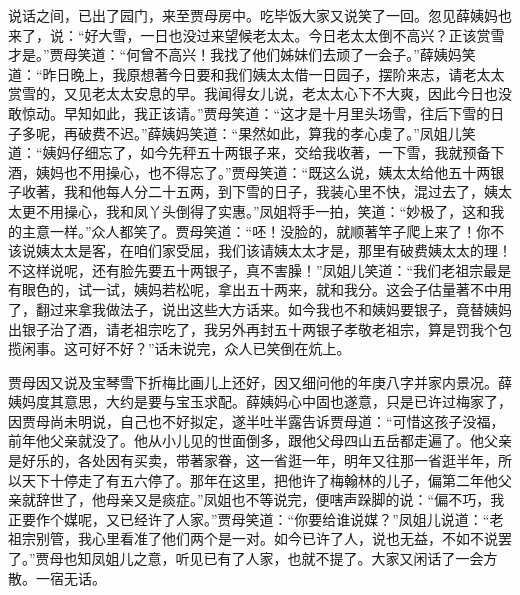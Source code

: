 \begin{parag}
    说话之间，已出了园门，来至贾母房中。吃毕饭大家又说笑了一回。忽见薛姨妈也来了，说：“好大雪，一日也没过来望候老太太。今日老太太倒不高兴？正该赏雪才是。”贾母笑道：“何曾不高兴！我找了他们姊妹们去顽了一会子。”薛姨妈笑道：“昨日晚上，我原想著今日要和我们姨太太借一日园子，摆阶来志，请老太太赏雪的，又见老太太安息的早。我闻得女儿说，老太太心下不大爽，因此今日也没敢惊动。早知如此，我正该请。”贾母笑道：“这才是十月里头场雪，往后下雪的日子多呢，再破费不迟。”薛姨妈笑道：“果然如此，算我的孝心虔了。”凤姐儿笑道：“姨妈仔细忘了，如今先秤五十两银子来，交给我收著，一下雪，我就预备下酒，姨妈也不用操心，也不得忘了。”贾母笑道：“既这么说，姨太太给他五十两银子收著，我和他每人分二十五两，到下雪的日子，我装心里不快，混过去了，姨太太更不用操心，我和凤丫头倒得了实惠。”凤姐将手一拍，笑道：“妙极了，这和我的主意一样。”众人都笑了。贾母笑道：“呸！没脸的，就顺著竿子爬上来了！你不该说姨太太是客，在咱们家受屈，我们该请姨太太才是，那里有破费姨太太的理！不这样说呢，还有脸先要五十两银子，真不害臊！”凤姐儿笑道：“我们老祖宗最是有眼色的，试一试，姨妈若松呢，拿出五十两来，就和我分。这会子估量著不中用了，翻过来拿我做法子，说出这些大方话来。如今我也不和姨妈要银子，竟替姨妈出银子治了酒，请老祖宗吃了，我另外再封五十两银子孝敬老祖宗，算是罚我个包揽闲事。这可好不好？”话未说完，众人已笑倒在炕上。
\end{parag}


\begin{parag}
    贾母因又说及宝琴雪下折梅比画儿上还好，因又细问他的年庚八字并家内景况。薛姨妈度其意思，大约是要与宝玉求配。薛姨妈心中固也遂意，只是已许过梅家了，因贾母尚未明说，自己也不好拟定，遂半吐半露告诉贾母道：“可惜这孩子没福，前年他父亲就没了。他从小儿见的世面倒多，跟他父母四山五岳都走遍了。他父亲是好乐的，各处因有买卖，带著家眷，这一省逛一年，明年又往那一省逛半年，所以天下十停走了有五六停了。那年在这里，把他许了梅翰林的儿子，偏第二年他父亲就辞世了，他母亲又是痰症。”凤姐也不等说完，便嗐声跺脚的说：“偏不巧，我正要作个媒呢，又已经许了人家。”贾母笑道：“你要给谁说媒？”凤姐儿说道：“老祖宗别管，我心里看准了他们两个是一对。如今已许了人，说也无益，不如不说罢了。”贾母也知凤姐儿之意，听见已有了人家，也就不提了。大家又闲话了一会方散。一宿无话。
\end{parag}


